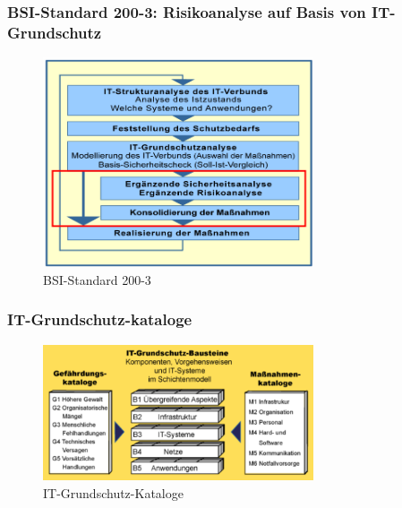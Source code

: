 \documentclass[10pt,a4paper]{article}
\begin{document}
\subsubsection*{BSI-Standard 200-3: Risikoanalyse auf Basis von IT-Grundschutz}
\begin{figure}[H]
    \begin{center}
    \includegraphics[width=8cm]{images/BSI200-3.png}
    \caption{BSI-Standard 200-3}
    \label{BSI-Standard 200-3}
    \end{center}
\end{figure}

\subsubsection*{IT-Grundschutz-kataloge}
\begin{figure}[H]
    \begin{center}
    \includegraphics[width=8cm]{images/IT-Grundschutz-Kataloge.png}
    \caption{IT-Grundschutz-Kataloge}
    \label{IT-Grundschutz-Kataloge}
    \end{center}
\end{figure}
\end{document}
